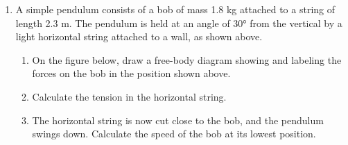 \documentclass{../../../oss-apphys}
\begin{document}
\begin{enumerate}[leftmargin=15pt]
  \begin{center}
  \end{center}
\item A simple pendulum consists of a bob of mass 1.8 kg attached to a string
  of length 2.3 m. The pendulum is held at an angle of \ang{30} from the
  vertical by a light horizontal string attached to a wall, as shown above.
  \begin{enumerate}[leftmargin=18pt,resume]
  \item On the figure below, draw a free-body diagram showing and labeling the
    forces on the bob in the position shown above.
    \begin{center}
    \end{center}
  \item Calculate the tension in the horizontal string.
  \item The horizontal string is now cut close to the bob, and the pendulum
    swings down. Calculate the speed of the bob at its lowest position.
  \end{enumerate}
  \newpage
  


\end{enumerate}
\end{document}
